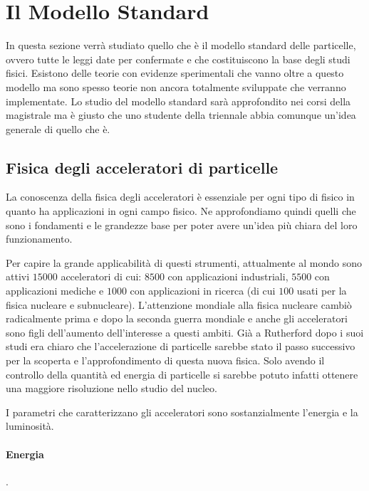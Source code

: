 \section{Il Modello Standard}
In questa sezione verrà studiato quello che è il modello standard delle particelle, ovvero tutte le leggi date per confermate e che costituiscono la base degli studi fisici. 
Esistono delle teorie con evidenze sperimentali che vanno oltre a questo modello ma sono spesso teorie non ancora totalmente sviluppate che verranno implementate.
Lo studio del modello standard sarà approfondito nei corsi della magistrale ma è giusto che uno studente della triennale abbia comunque un'idea generale di quello che è.

\subsection{Fisica degli acceleratori di particelle}
La conoscenza della fisica degli acceleratori è essenziale per ogni tipo di fisico in quanto ha applicazioni in ogni campo fisico.
Ne approfondiamo quindi quelli che sono i fondamenti e le grandezze base per poter avere un'idea più chiara del loro funzionamento.

Per capire la grande applicabilità di questi strumenti, attualmente al mondo sono attivi $15000$ acceleratori di cui: $8500$ con applicazioni industriali, $5500$ con applicazioni mediche e $1000$ con applicazioni in ricerca (di cui $100$ usati per la fisica nucleare e subnucleare).
L'attenzione mondiale alla fisica nucleare cambiò radicalmente prima e dopo la seconda guerra mondiale e anche gli acceleratori sono figli dell'aumento dell'interesse a questi ambiti.
Già a Rutherford dopo i suoi studi era chiaro che l'accelerazione di particelle sarebbe stato il passo successivo per la scoperta e l'approfondimento di questa nuova fisica.
Solo avendo il controllo della quantità ed energia di particelle si sarebbe potuto infatti ottenere una maggiore risoluzione nello studio del nucleo.

I parametri che caratterizzano gli acceleratori sono sostanzialmente l'energia e la luminosità.

\paragraph{Energia}. 

